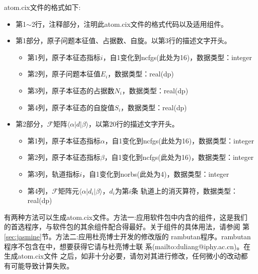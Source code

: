 atom.cix文件的格式如下:
\begin{itemize}
  \item 第1$\sim$2行，注释部分，注明此atom.cix文件的格式代码以及适用组件。
  \item 第1部分，原子问题本征值、占据数、自旋。以第3行的描述文字开头。 
  \begin{itemize}
    \item 第1列，原子本征态指标$i$，自1变化到ncfgs(此处为16)，数据类型：integer
    \item 第2列，原子问题本征值$E_{i}$，数据类型：real(dp)
    \item 第3列，原子本征态的占据数$N_{i}$，数据类型：real(dp)
    \item 第4列，原子本征态的自旋值$S_{i}$，数据类型：real(dp)
  \end{itemize}
  \item 第2部分，$\mathcal{F}$矩阵$\langle \alpha | d | \beta \rangle$，以第20行的描述文字开头。
  \begin{itemize}
    \item 第1列，原子本征态指标$\alpha$，自1变化到ncfgs(此处为16)，数据类型：integer
    \item 第2列，原子本征态指标$\beta$，自1变化到ncfgs(此处为16)，数据类型：integer
    \item 第3列，轨道指标$i$，自1变化到norbs(此处为4)，数据类型：integer
    \item 第4列，$\mathcal{F}$矩阵元$\langle \alpha | d_{i} | \beta \rangle$，$d_{i}$为第$i$条
    轨道上的消灭算符，数据类型：real(dp)
  \end{itemize}
\end{itemize}

有两种方法可以生成atom.cix文件。方法一:应用{\iqist}软件包中内含的{\jasmine}组件，这是我们
的首选程序，与{\iqist}软件包的其余组件配合得最好。关于{\jasmine}组件的具体用法，请参阅
第\ref{sec:jasmine}节。方法二:应用杜亮博士开发的修改版的
rambutan程序。rambutan程序不包含在{\iqist}中，想要获得它请与杜亮博士联
系(mailto:duliang@iphy.ac.cn)。在生成atom.cix文件
之后，如非十分必要，请勿对其进行修改，任何微小的改动都有可能导致计算失败。
